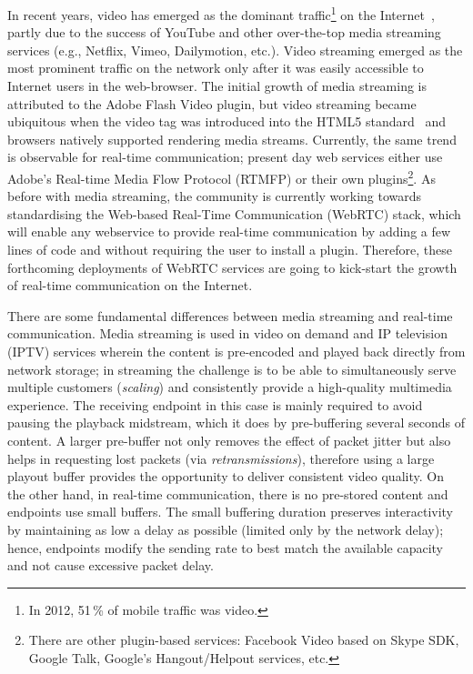 In recent years, video has emerged as the dominant traffic\footnote{In 2012,
51\,\% of mobile traffic was video.} on the Internet~\cite{cvni.13,dawn.zb},
partly due to the success of YouTube and other over-the-top media streaming
services (e.g., Netflix, Vimeo, Dailymotion, etc.). Video streaming emerged as
the most prominent traffic on the network only after it was easily accessible
to Internet users in the web-browser. The initial growth of media streaming
is attributed to the Adobe Flash Video plugin, but video streaming became ubiquitous when
the video tag was introduced into the HTML5 standard~\cite{html5-spec} and
browsers natively supported rendering media streams. Currently, the same trend
is observable for real-time communication; present day web services either use
Adobe's Real-time Media Flow Protocol (RTMFP) \cite{draft.rtmfp} or 
their own plugins\footnote{There are other plugin-based services: Facebook
Video based on Skype SDK, Google Talk, Google's Hangout/Helpout services,
etc.}. As before with media streaming, the community is currently working
towards standardising the Web-based Real-Time Communication (WebRTC) stack,
which will enable any webservice to provide real-time communication by adding
a few lines of code and without requiring the user to install a plugin.
Therefore, these forthcoming deployments of WebRTC services are going to 
kick-start the growth of real-time communication on the Internet.


There are some fundamental differences between media streaming and real-time
communication. Media streaming is used in video on demand and IP television
(IPTV) services wherein the content is pre-encoded and played back directly
from network storage; in streaming the challenge is to be able to simultaneously serve
multiple customers (\emph{scaling}) and consistently provide a high-quality
multimedia experience. The receiving endpoint in this case is mainly required
to avoid pausing the playback midstream, which it does by pre-buffering
several seconds of content. A larger pre-buffer not only removes the effect of
packet jitter but also helps in requesting lost packets (via
\emph{retransmissions}), therefore using a large playout buffer provides the
opportunity to deliver consistent video quality.
On the other hand, in real-time communication, there is no pre-stored content
and endpoints use small buffers. The small buffering duration preserves
interactivity by maintaining as low a delay as possible (limited only by the
network delay); hence, endpoints modify the sending rate to best match the
available capacity and not cause excessive packet delay.

